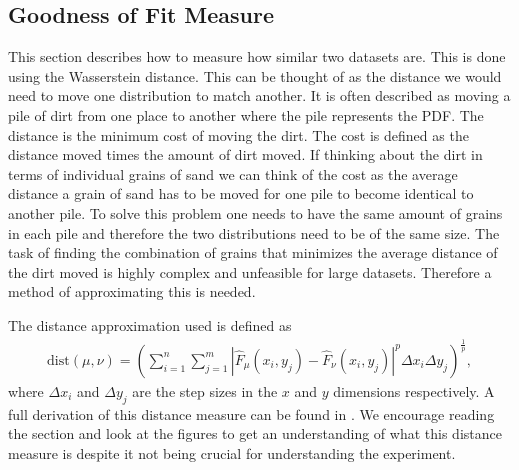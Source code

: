 \subsection{Goodness of Fit Measure}\label{sec:GoodnessOfFit}
This section describes how to measure how similar two datasets are. This is done using the Wasserstein distance. This can be thought of as the distance we would need to move one distribution to match another. It is often described as moving a pile of dirt from one place to another where the pile represents the \gls{PDF}. The distance is the minimum cost of moving the dirt. The cost is defined as the distance moved times the amount of dirt moved. If thinking about the dirt in terms of individual grains of sand we can think of the cost as the average distance a grain of sand has to be moved for one pile to become identical to another pile. To solve this problem one needs to have the same amount of grains in each pile and therefore the two distributions need to be of the same size. The task of finding the combination of grains that minimizes the average distance of the dirt moved is highly complex and unfeasible for large datasets. Therefore a method of approximating this is needed. 

The distance approximation used is defined as 
\begin{align*}
    \mathrm{dist}(\mu,\nu) = \left( \sum_{i=1}^n \sum_{j=1}^m |\hat F_\mu(x_i,y_j) - \hat F_\nu(x_i,y_j)|^p \Delta x_i \Delta y_j \right)^{\frac{1}{p}},
\end{align*}
where $\Delta x_i$ and $\Delta y_j$ are the step sizes in the $x$ and $y$ dimensions respectively. A full derivation of this distance measure can be found in . We encourage reading the section and look at the figures to get an understanding of what this distance measure is despite it not being crucial for understanding the experiment.  










